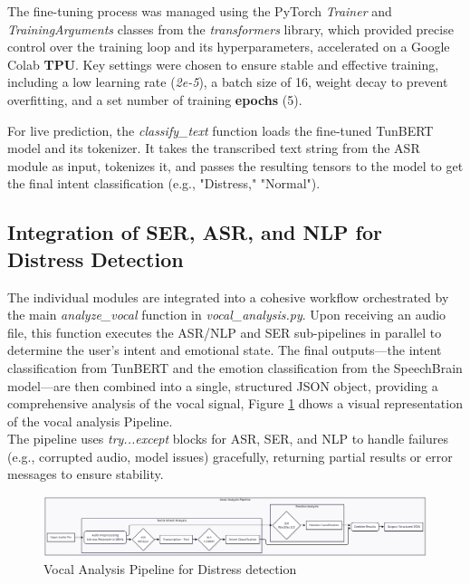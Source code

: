 \documentclass[12pt,a4paper,oneside,english]{book}
\begin{document}
The fine-tuning process was managed using the PyTorch \textit{Trainer} and \textit{TrainingArguments} classes from the \textit{transformers} library, which provided precise control over the training loop and its hyperparameters, accelerated on a Google Colab \textbf{TPU}. 
Key settings were chosen to ensure stable and effective training, including a low learning rate (\textit{2e-5}), 
a batch size of 16, weight decay to prevent overfitting, and a set number of training \textbf{epochs} (5).

For live prediction, the \textit{classify\_text} function loads the fine-tuned TunBERT model and its tokenizer. It takes the transcribed text string from the ASR module as input, tokenizes it, and passes the 
resulting tensors to the model to get the final intent classification (e.g., "Distress," "Normal").

\subsection{Integration of SER, ASR, and NLP for Distress Detection}%
\label{integration_ser_asr_nlp}
The individual modules are integrated into a cohesive workflow orchestrated by the main \textit{analyze\_vocal} function in \textit{vocal\_analysis.py}. Upon receiving an audio file, this function 
executes the ASR/NLP and SER sub-pipelines in parallel to determine the user's intent and emotional state. The final outputs—the intent classification from TunBERT and the emotion classification from 
the SpeechBrain model—are then combined into a single, structured JSON object, providing a comprehensive analysis of the vocal signal, Figure \ref{fig:vocal_pipe} dhows a visual representation of the vocal analysis Pipeline.
\\The pipeline uses \textit{try...except} blocks for ASR, SER, and NLP to handle failures (e.g., corrupted audio, model issues) gracefully, returning partial results or error messages to ensure stability.

\begin{figure}[h!] %
    \centering
    \includegraphics[width=1\textwidth]{images/vocal_analysis_pipeline.png}
    \caption{Vocal Analysis Pipeline for  Distress detection}
    \label{fig:vocal_pipe}
\end{figure}
\end{document}
